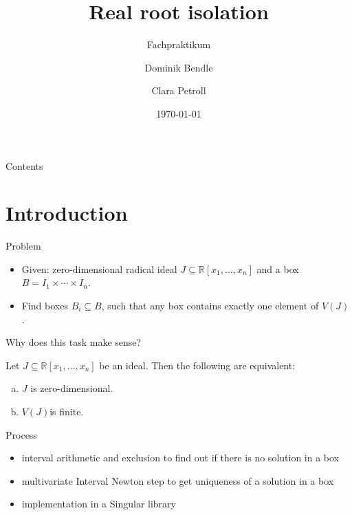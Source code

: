 \documentclass[german,10pt,xcolor=colortbl,compress,handout]{beamer}
\title{Real root isolation}
\subtitle{Fachpraktikum}
\date{\today}
\author{Dominik Bendle \and Clara Petroll}
\institute{AG Algebra, Geometrie und Computeralgebra \\ Supervisor: Janko Böhm}
\begin{document}
\maketitle
\begin{frame}{Contents}
    \tableofcontents
\end{frame}

\section{Introduction}
\begin{frame}{Problem}
    \begin{itemize}
        \item Given: zero-dimensional radical ideal  $J \subseteq \mathbb{R}[x_1, \hdots,
            x_n]$ and a box  $B=I_1 \times \cdots \times I_n$.
        \pause
        \item Find boxes $B_i \subseteq B$, such that any box contains exactly one element
            of $V(J)$.
    \end{itemize}
    \pause

    Why does this task make sense?
    \pause
    \begin{lemma}
        Let $J \subseteq \mathbb{R}[x_1, \hdots, x_n]$ be an ideal. Then the following are
        equivalent:
        \begin{enumerate}[a)]
            \item $J$ is zero-dimensional.
            \item $V(J)$is finite.
        \end{enumerate}
    \end{lemma}
\end{frame}

\begin{frame}{Process}
    \begin{itemize}
    \item interval arithmetic and exclusion to find out if there is no solution in a box
    \pause
    \item multivariate Interval Newton step to get uniqueness of a solution in a box
    \pause
    \item implementation in a Singular library
    \end{itemize}
\end{frame}
\end{document}
